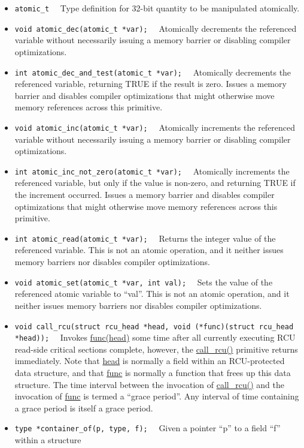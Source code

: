 \begin{itemize}
\item	{\tt atomic\_t}~~
	Type definition for 32-bit quantity to be manipulated atomically.
\item	{\tt void atomic\_dec(atomic\_t *var);}~~
	Atomically decrements the referenced variable without necessarily
	issuing a memory barrier or disabling compiler optimizations.
\item	{\tt int atomic\_dec\_and\_test(atomic\_t *var);}~~
	Atomically decrements the referenced variable, returning
	TRUE if the result is zero.
	Issues a memory barrier and disables compiler optimizations that
	might otherwise move memory references across this primitive.
\item	{\tt void atomic\_inc(atomic\_t *var);}~~
	Atomically increments the referenced variable without necessarily
	issuing a memory barrier or disabling compiler optimizations.
\item	{\tt int atomic\_inc\_not\_zero(atomic\_t *var);}~~
	Atomically increments the referenced variable, but only if the
	value is non-zero, and returning TRUE if the increment occurred.
	Issues a memory barrier and disables compiler optimizations that
	might otherwise move memory references across this primitive.
\item	{\tt int atomic\_read(atomic\_t *var);}~~
	Returns the integer value of the referenced variable.
	This is not an atomic operation, and it neither issues memory
	barriers nor disables compiler optimizations.
\item	{\tt void atomic\_set(atomic\_t *var, int val);}~~
	Sets the value of the referenced atomic variable to ``val''.
	This is not an atomic operation, and it neither issues memory
	barriers nor disables compiler optimizations.
\item	{\tt void call\_rcu(struct rcu\_head *head, void (*func)(struct rcu\_head *head));}~~
	Invokes \url{func(head)} some time after all currently executing RCU
	read-side critical sections complete, however, the \url{call_rcu()}
	primitive returns immediately.
	Note that \url{head} is normally a field within an RCU-protected
	data structure, and that \url{func} is normally a function that
	frees up this data structure.
	The time interval between the invocation of \url{call_rcu()} and
	the invocation of \url{func} is termed a ``grace period''.
	Any interval of time containing a grace period is itself a
	grace period.
\item	{\tt type *container\_of(p, type, f);}~~
	Given a pointer ``p'' to a field ``f'' within a structure

\end{itemize}
